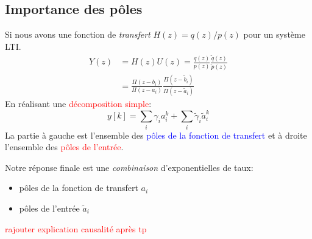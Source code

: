 \documentclass{report}
\begin{document}
\subsection{Importance des pôles}
Si nous avons une fonction de \textit{transfert} $H(z) = q(z)/p(z)$ pour un système LTI.
\begin{align*}
Y(z) &= H(z) U(z) = \frac{q(z)}{p(z)} \frac{\tilde{q}(z)}{\tilde{p}(z)}\\
&= \frac{\Pi (z-b_i)}{\Pi (z-a_i)} \frac{\Pi (z- \tilde{b}_i)}{\Pi (z - \tilde{a}_i)}
\end{align*}
En réalisant une \textcolor{red}{décomposition simple}:
\begin{equation}
y[k] = \sum_i \gamma_i a_i^k + \sum_i \tilde{\gamma}_i \tilde{a}_i^k
\end{equation}
La partie à gauche est l'ensemble des \textcolor{blue}{pôles de la fonction de transfert} et à droite l'ensemble des \textcolor{red}{pôles de l'entrée}.\par
Notre réponse finale est une \textit{combinaison} d'exponentielles de taux:
\begin{itemize}
\item pôles de la fonction de transfert $a_i$
\item pôles de l'entrée $\tilde{a}_i$
\end{itemize}

\textcolor{red}{rajouter explication causalité après tp}
\end{document}
